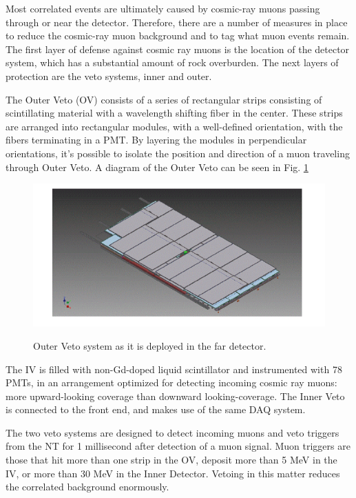 Most correlated events are ultimately caused by cosmic-ray muons passing through or near the detector. Therefore, there are a number of measures in place to reduce the cosmic-ray muon background and to tag what muon events remain. The first layer of defense against cosmic ray muons is the location of the detector system, which has a substantial amount of rock overburden. The next layers of protection are the veto systems, inner and outer. 

The Outer Veto (OV) consists of a series of rectangular strips consisting of scintillating material with a wavelength shifting fiber in the center. These strips are arranged into rectangular modules, with a well-defined orientation, with the fibers terminating in a PMT. By layering the modules in perpendicular orientations, it's possible to isolate the position and direction of a muon traveling through Outer Veto. A diagram of the Outer Veto can be seen in Fig. \ref{OV}

\begin{figure}
\caption{Outer Veto system as it is deployed in the far detector.}
\centering
\includegraphics[width=\textwidth]{DC_Results/Outer_Veto.jpg}
\label{OV}
\end{figure}


The IV is filled with non-Gd-doped liquid scintillator and instrumented with 78 PMTs, in an arrangement optimized for detecting incoming cosmic ray muons: more upward-looking coverage than downward looking-coverage.  The Inner Veto is connected to the front end, and makes use of the same DAQ system. 

The two veto systems are designed to detect incoming muons and veto triggers from the NT for 1 millisecond after detection of a muon signal. Muon triggers are those that hit more than one strip in the OV, deposit more than 5 MeV in the IV, or more than 30 MeV in the Inner Detector. Vetoing in this matter reduces the correlated background enormously. 

